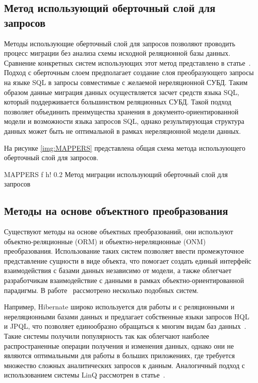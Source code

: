 \clearpage

\subsection{Метод использующий оберточный слой для запросов}
Методы использующие оберточный слой для запросов позволяют проводить процесс миграции без анализа схемы исходной реляционной базы данных.
Сравнение конкретных систем использующих этот метод представлено в статье~\cite{mappers}.
Подход с оберточным слоем предполагает создание слоя преобразующего запросы на языке SQL в запросы совместимые с желаемой нереляционной СУБД.
Таким образом данные миграция данных осуществляется засчет средств языка SQL, который поддерживается большинством реляционных СУБД.
Такой подход позволяет объединить преимущества хранения в документо-ориентированной модели и возможности языка запросов SQL,
однако результирующая структура данных может быть не оптимальной в рамках нереляционной модели данных.

На рисунке \ref{img:MAPPERS} представлена общая схема метода использующего оберточный слой для запросов.

  {MAPPERS} %
  {f} %
  {h!} %
  {0.2\textwidth} %
{Метод миграции использующий оберточный слой для запросов} %

\clearpage

\subsection{Методы на основе объектного преобразования}
Существуют методы на основе объектных преобразований, они используют объектно-реляционные (ORM) и объектно-нереляционные (ONM) преобразования.
Использование таких систем позволяет ввести промежуточное представление сущности в виде объекта,
что помогает создать единый интерфейс взаимодействия с базами данных независимо от модели,
а также облегчает разработчикам взаимодействие с данными в рамках объектно-ориентированной парадигмы.
В работе~\cite{ONM} рассмотрено несколько подобных систем.

Например, Hibernate широко используется для работы и с реляционными и нереляционными базами данных и предлагает собственные языки запросов HQL и JPQL,
что позволяет единообразно обращаться к многим видам баз данных~\cite{hibernateogm}.
Такие системы получили популярность так как облегчают наиболее распространенные операции получения и изменения данных,
однако они не являются оптимальными для работы в больших приложениях,
где требуется множество сложных аналитических запросов к данным.
Аналогичный подход с использованием системы LinQ рассмотрен в статье~\cite{linq}.

